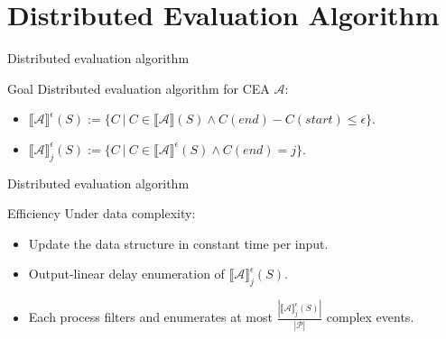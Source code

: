 \documentclass[xcolor=pdftex,dvipsnames,table]{beamer}
\begin{document}

\section{Distributed Evaluation Algorithm}

\begin{frame}{Distributed evaluation algorithm}
  \begin{block}{Goal}
    Distributed evaluation algorithm for CEA $\mathcal{A}$:
   \begin{itemize}
     \item ${\llbracket \mathcal{A} \rrbracket}^{\epsilon}(S) := \{ C \ | \ C \in {\llbracket \mathcal{A} \rrbracket}(S) \land C(end) - C(start) \le \epsilon\}$.
     \pause
     \item ${\llbracket \mathcal{A} \rrbracket}^{\epsilon}_{j}(S) := \{ C \ | \ C \in {\llbracket \mathcal{A} \rrbracket}^{\epsilon}(S) \land C(end) = j \}$.
   \end{itemize}
  \end{block}
\end{frame}


\begin{frame}{Distributed evaluation algorithm}
  \begin{block}{Efficiency}
     Under data complexity:
      \begin{itemize}
        \item Update the data structure in constant time per input.
        \pause
        \item Output-linear delay enumeration of ${\llbracket \mathcal{A} \rrbracket}^{\epsilon}_{j}(S)$.
        \pause
        \item Each process filters and enumerates at most $\frac{|{\llbracket \mathcal{A} \rrbracket}^{\epsilon}_{j}(S)|}{|\mathcal{P}|}$ complex events.
      \end{itemize}
  \end{block}
\end{frame}

\end{document}

